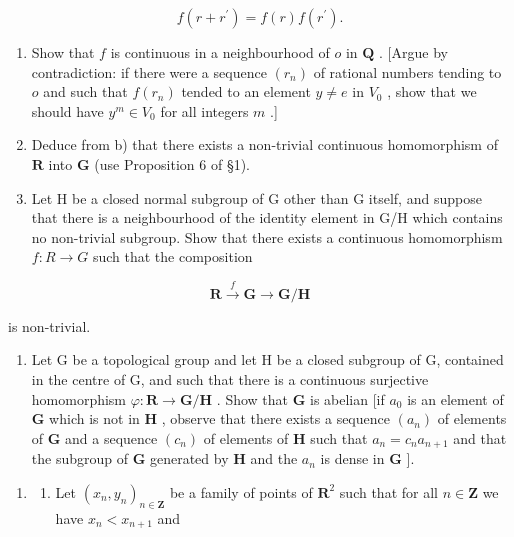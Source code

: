 \[
f (r + r ^ {\prime}) = f (r) f (r ^ {\prime}).
\]

\begin{enumerate}
\def\labelenumi{\alph{enumi})}
\setcounter{enumi}{1}
\item
  Show that \(f\) is continuous in a neighbourhood of \(o\) in \(\mathbf{Q}\) . {[}Argue by contradiction: if there were a sequence \((r_n)\) of rational numbers tending to \(o\) and such that \(f(r_n)\) tended to an element \(y \neq e\) in \(V_0\) , show that we should have \(y^m \in V_0\) for all integers \(m\) .{]}
\item
  Deduce from b) that there exists a non-trivial continuous homomorphism of \(\mathbf{R}\) into \(\mathbf{G}\) (use Proposition 6 of §1).
\item
  Let H be a closed normal subgroup of G other than G itself, and suppose that there is a neighbourhood of the identity element in G/H which contains no non-trivial subgroup. Show that there exists a continuous homomorphism \(f: R \rightarrow G\) such that the composition
\end{enumerate}

\[
\mathbf {R} \xrightarrow {f} \mathbf {G} \to \mathbf {G} / \mathbf {H}
\]

is non-trivial.

\begin{enumerate}
\def\labelenumi{\arabic{enumi})}
\setcounter{enumi}{7}
\tightlist
\item
  Let G be a topological group and let H be a closed subgroup of G, contained in the centre of G, and such that there is a continuous surjective homomorphism \(\varphi: \mathbf{R} \to \mathbf{G} / \mathbf{H}\) . Show that \(\mathbf{G}\) is abelian {[}if \(a_0\) is an element of \(\mathbf{G}\) which is not in \(\mathbf{H}\) , observe that there exists a sequence \((a_n)\) of elements of \(\mathbf{G}\) and a sequence \((c_n)\) of elements of \(\mathbf{H}\) such that \(a_n = c_n a_{n+1}\) and that the subgroup of \(\mathbf{G}\) generated by \(\mathbf{H}\) and the \(a_n\) is dense in \(\mathbf{G}\) {]}.
\end{enumerate}

\ExerciseSection

\begin{enumerate}
\def\labelenumi{\arabic{enumi})}
\tightlist
\item
  \begin{enumerate}
  \def\labelenumii{\alph{enumii})}
  \tightlist
  \item
    Let \((x_{n}, y_{n})_{n \in \mathbf{Z}}\) be a family of points of \(\mathbf{R}^{2}\) such that for all \(n \in \mathbf{Z}\) we have \(x_{n} < x_{n+1}\) and
  \end{enumerate}
\end{enumerate}

